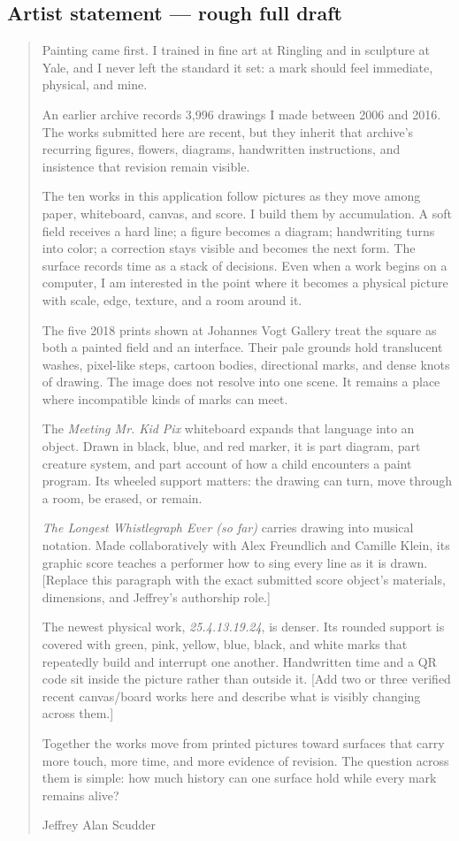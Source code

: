 \documentclass[11pt,letterpaper]{article}
\begin{document}
\subsection{Artist statement --- rough full draft}

\begin{quote}
\small
Painting came first. I trained in fine art at Ringling and in sculpture at Yale, and I never left the standard it set: a mark should feel immediate, physical, and mine.

An earlier archive records 3,996 drawings I made between 2006 and 2016. The works submitted here are recent, but they inherit that archive's recurring figures, flowers, diagrams, handwritten instructions, and insistence that revision remain visible.

The ten works in this application follow pictures as they move among paper, whiteboard, canvas, and score. I build them by accumulation. A soft field receives a hard line; a figure becomes a diagram; handwriting turns into color; a correction stays visible and becomes the next form. The surface records time as a stack of decisions. Even when a work begins on a computer, I am interested in the point where it becomes a physical picture with scale, edge, texture, and a room around it.

The five 2018 prints shown at Johannes Vogt Gallery treat the square as both a painted field and an interface. Their pale grounds hold translucent washes, pixel-like steps, cartoon bodies, directional marks, and dense knots of drawing. The image does not resolve into one scene. It remains a place where incompatible kinds of marks can meet.

The \textit{Meeting Mr. Kid Pix} whiteboard expands that language into an object. Drawn in black, blue, and red marker, it is part diagram, part creature system, and part account of how a child encounters a paint program. Its wheeled support matters: the drawing can turn, move through a room, be erased, or remain.

\textit{The Longest Whistlegraph Ever (so far)} carries drawing into musical notation. Made collaboratively with Alex Freundlich and Camille Klein, its graphic score teaches a performer how to sing every line as it is drawn. [Replace this paragraph with the exact submitted score object's materials, dimensions, and Jeffrey's authorship role.]

The newest physical work, \textit{25.4.13.19.24}, is denser. Its rounded support is covered with green, pink, yellow, blue, black, and white marks that repeatedly build and interrupt one another. Handwritten time and a QR code sit inside the picture rather than outside it. [Add two or three verified recent canvas/board works here and describe what is visibly changing across them.]

Together the works move from printed pictures toward surfaces that carry more touch, more time, and more evidence of revision. The question across them is simple: how much history can one surface hold while every mark remains alive?

Jeffrey Alan Scudder
\end{quote}
\end{document}
